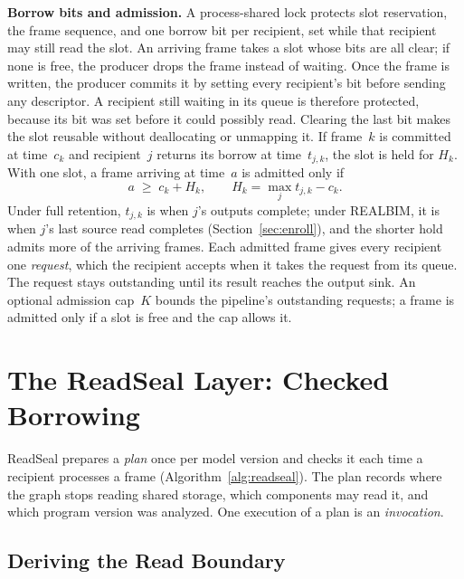 \documentclass[conference]{IEEEtran}
\newcommand{\sys}{REALBIM}
\begin{document}
\textbf{Borrow bits and admission.} A process-shared lock protects slot reservation, the frame sequence, and one borrow bit per recipient, set while that recipient may still read the slot. An arriving frame takes a slot whose bits are all clear; if none is free, the producer drops the frame instead of waiting. Once the frame is written, the producer commits it by setting every recipient's bit before sending any descriptor. A recipient still waiting in its queue is therefore protected, because its bit was set before it could possibly read. Clearing the last bit makes the slot reusable without deallocating or unmapping it. If frame~$k$ is committed at time~$c_k$ and recipient~$j$ returns its borrow at time~$t_{j,k}$, the slot is held for $H_k$. With one slot, a frame arriving at time~$a$ is admitted only if
\begin{equation}
a\;\ge\; c_k+H_k, \qquad H_k=\max_j t_{j,k}-c_k. \label{eq:hold}
\end{equation}
Under full retention, $t_{j,k}$ is when $j$'s outputs complete; under \sys, it is when $j$'s last source read completes (Section~\ref{sec:enroll}), and the shorter hold admits more of the arriving frames. Each admitted frame gives every recipient one \emph{request}, which the recipient accepts when it takes the request from its queue. The request stays outstanding until its result reaches the output sink. An optional admission cap~$K$ bounds the pipeline's outstanding requests; a frame is admitted only if a slot is free and the cap allows it.

\section{The ReadSeal Layer: Checked Borrowing}
\label{sec:readseal}

ReadSeal prepares a \emph{plan} once per model version and checks it each time a recipient processes a frame (Algorithm~\ref{alg:readseal}). The plan records where the graph stops reading shared storage, which components may read it, and which program version was analyzed. One execution of a plan is an \emph{invocation}.

\subsection{Deriving the Read Boundary}
\label{sec:derive}
\end{document}
